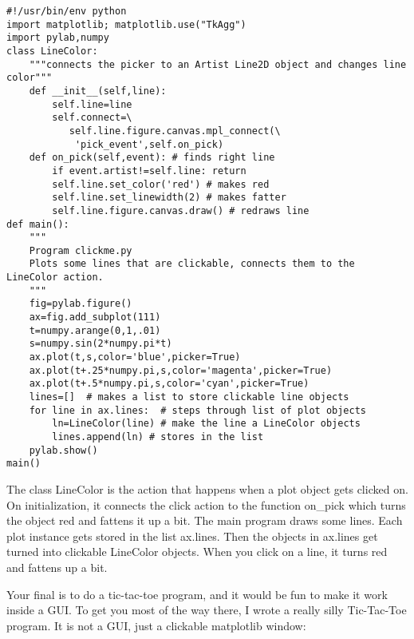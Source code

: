  {\singlespacing \color{blue} \begin{verbatim}
#!/usr/bin/env python
import matplotlib; matplotlib.use("TkAgg")
import pylab,numpy
class LineColor: 
    """connects the picker to an Artist Line2D object and changes line color"""
    def __init__(self,line):
        self.line=line
        self.connect=\
           self.line.figure.canvas.mpl_connect(\
            'pick_event',self.on_pick)  
    def on_pick(self,event): # finds right line
        if event.artist!=self.line: return 
        self.line.set_color('red') # makes red
        self.line.set_linewidth(2) # makes fatter
        self.line.figure.canvas.draw() # redraws line
def main():
    """
    Program clickme.py
    Plots some lines that are clickable, connects them to the LineColor action.
    """
    fig=pylab.figure()
    ax=fig.add_subplot(111)
    t=numpy.arange(0,1,.01)
    s=numpy.sin(2*numpy.pi*t)
    ax.plot(t,s,color='blue',picker=True)
    ax.plot(t+.25*numpy.pi,s,color='magenta',picker=True)
    ax.plot(t+.5*numpy.pi,s,color='cyan',picker=True)
    lines=[]  # makes a list to store clickable line objects
    for line in ax.lines:  # steps through list of plot objects
        ln=LineColor(line) # make the line a LineColor objects
        lines.append(ln) # stores in the list
    pylab.show()
main()
\end{verbatim}}
 
\noindent  The class {\color{blue}LineColor} is the action that happens when a plot object gets clicked on. On initialization, it connects the click action to the function {\color{blue}on\_pick} which turns the object red and fattens it up a bit.   The main program draws some lines.  Each plot instance gets stored in the list ax.lines.  Then the objects in ax.lines get turned into clickable LineColor objects.   When you click on a line, it turns red and fattens up a bit.  

Your final is to do a tic-tac-toe program, and it would be fun to make it work inside a GUI.  To get you most of the way there,  I wrote  a  really silly   Tic-Tac-Toe program.  It is not a GUI, just a clickable matplotlib window:   

